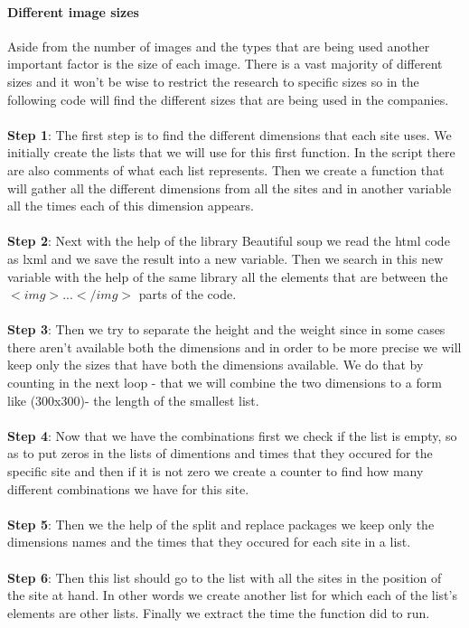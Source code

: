 \documentclass{article}
\begin{document}
\paragraph{Different image sizes}\label{dif_img_s} 
Aside from the number of images and the types that are being used another important factor is the size of each image. There is a vast majority of different sizes and it won't be wise to restrict the research to specific sizes so in the following code will find the different sizes that are being used in the companies.\\\\
\textbf{Step 1}: The first step is to find the different dimensions that each site uses. We initially create the lists that we will use for this first function. In the script there are also comments of what each list represents. Then we create a function that will gather all the different dimensions from all the sites and in another variable all the times each of this dimension appears. \\\\
\textbf{Step 2}: Next with the help of the library Beautiful soup we read the html code as lxml and we save the result into a new variable. Then we search in this new variable with the help of the same library all the elements that are between the $<img>...</img>$ parts of the code.\\\\
\textbf{Step 3}: Then we try to separate the height and the weight since in some cases there aren't available both the dimensions and in order to be more precise we will keep only the sizes that have both the dimensions available. We do that by counting in the next loop - that we will combine the two dimensions to a form like (300x300)- the length of the smallest list. \\\\
\textbf{Step 4}: Now that we have the combinations first we check if the list is empty, so as to put zeros in the lists of dimentions and times that they occured for the specific site and then if it is not zero we create a counter to find how many different combinations we have for this site.\\\\
\textbf{Step 5}: Then we the help of the split and replace packages we keep only the dimensions names and the times that they occured for each site in a list.\\\\
\textbf{Step 6}: Then this list should go to the list with all the sites in the position of the site at hand. In other words we create another list for which each of the list's elements are other lists. Finally we extract the time the function did to run.\\\\
\end{document}
